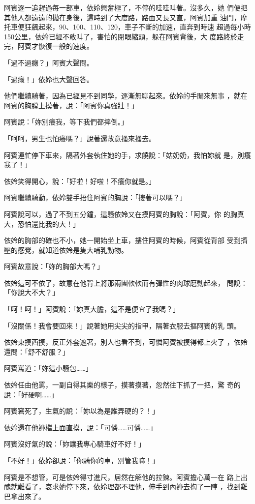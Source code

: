 阿賓逐一追趕過每一部車，依姈興奮極了，不停的哇哇叫著。沒多久，她
們便把其他人都遠遠的拋在身後，這時到了大度路，路面又長又直，阿賓加重
油門，摩托車便狂飆起來，90、100、110、120，車子不斷的加速，直奔到時速
超過每小時150公里，依姈已經不敢叫了，害怕的閉眼縮頭，躲在阿賓背後，大
度路終於走完，阿賓才恢復一般的速度。

「過不過癮？」阿賓大聲問。

「過癮！」依姈也大聲回答。

他們繼續騎著，因為已經見不到同學，逐漸無聊起來。依姈的手閒來無事
，就在阿賓的胸膛上摸著，說：「阿賓你真強壯！」

阿賓說：「妳別癢我，等下我們都摔倒。」

「呵呵，男生也怕癢嗎？」說著還故意搔來搔去。

阿賓連忙停下車來，隔著外套執住她的手，求饒說：「姑奶奶，我怕妳就
是，別癢我了！」

依姈笑得開心，說：「好啦！好啦！不癢你就是。」

阿賓繼續騎動，依姈雙手捂住阿賓的胸說：「摟著可以嗎？」

阿賓說可以，過了不到五分鐘，這騷依姈又在摸阿賓的胸說：「阿賓，你
的胸真大，恐怕還比我的大！」

依姈的胸部的確也不小，她一開始坐上車，摟住阿賓的時候，阿賓從背部
受到擠壓的感覺，就知道依姈是隻大哺乳動物。

阿賓故意說：「妳的胸部大嗎？」

依姈這可不依了，故意在他背上將那兩團軟軟而有彈性的肉球磨動起來，
問說：「你說大不大？」

「呵！呵！」阿賓說：「妳真大膽，這不是便宜了我嗎？」

「沒關係！我會要回來！」說著她用尖尖的指甲，隔著衣服去摳阿賓的乳
頭。

依姈東摸西摸，反正外套遮著，別人也看不到，可憐阿賓被摸得都上火了
，依姈還問：「舒不舒服？」

阿賓罵道：「妳這小騷包……」

依姈任由他罵，一副自得其樂的樣子，摸著摸著，忽然往下抓了一把，驚
奇的說：「好硬啊……」

阿賓窘死了，生氣的說：「妳以為是誰弄硬的？！」

依姈還在他褲檔上面直摸，說：「可憐……可憐……」

阿賓沒好氣的說：「妳讓我專心騎車好不好！」

「不好！」依姈卻說：「你騎你的車，別管我嘛！」

阿賓是不想管，可是依姈得寸進尺，居然在解他的拉鍊。阿賓擔心萬一在
路上出醜就難看了，哀求她停下來，依姈理都不理他，伸手到內褲去掏了一陣
，找到雞巴拿出來了。


